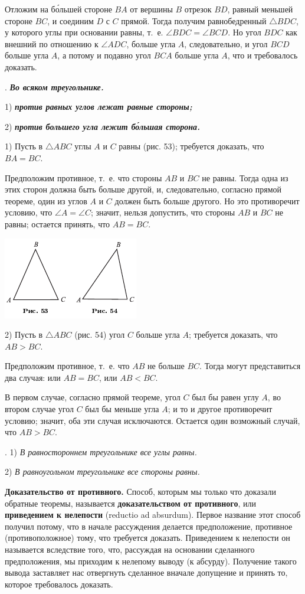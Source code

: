 \documentclass[oneside]{book}
\begin{document}
Отложим на б\'{о}льшей стороне $BA$ от вершины $B$ отрезок $BD$, равный меньшей стороне $BC$, и соединим $D$ с $C$ прямой.
Тогда получим равнобедренный $\triangle BDC$, у которого углы при основании равны, т.~е. $\angle BDC=\angle BCD$.
Но угол $BDC$ как внешний по отношению к $\angle ADC$, больше угла $A$, следовательно, и угол $BCD$ больше угла $A$, а потому и подавно угол $BCA$ больше угла $A$, что и требовалось доказать.

.
\textbf{\emph{Во всяком треугольнике.}}

1) \textbf{\emph{против равных углов лежат равные стороны;}}

2) \textbf{\emph{против большего угла лежит б\'{о}льшая сторона.}}

1) Пусть в $\triangle ABC$ углы $A$ и $C$ равны (рис. 53);
требуется доказать, что $BA = BC$.

Предположим противное, т.~е. что стороны $AB$ и $BC$ не равны.
Тогда одна из этих сторон должна быть больше другой, и, следовательно, согласно прямой теореме, один из углов $A$ и $C$ должен быть больше другого.
Но это противоречит условию, что $\angle A = \angle C$;
значит, нельзя допустить, что стороны $AB$ и $BC$ не равны;
остается принять, что $AB=BC$.

\includegraphics{pics/ris-53-54}

2) Пусть в $\triangle ABC$ (рис. 54)
угол $C$ больше угла $A$;
требуется доказать, что $AB > BC$.

Предположим противное, т.~е. что $AB$ не больше $BC$.
Тогда могут представиться два случая:
или $AB=BC$, или $AB<BC$.

В первом случае, согласно прямой теореме, угол $C$ был бы равен углу $A$, во втором случае угол $C$ был бы меньше угла $A$;
и то и другое противоречит условию;
значит, оба эти случая исключаются.
Остается один возможный случай, что $AB>BC$.

.
1) \emph{В равностороннем треугольнике все углы равны.}

2) \emph{В равноугольном треугольнике все стороны равны.}

\textbf{Доказательство от противного.}
Способ, которым мы только что доказали обратные теоремы, называется \textbf{доказательством от противного}, или \textbf{приведением к нелепости} (reductio ad absurdum).
Первое название этот способ получил потому, что в начале рассуждения делается предположение, противное (противоположное) тому, что требуется доказать.
Приведением к нелепости он называется вследствие того, что, рассуждая на основании сделанного предположения, мы приходим к нелепому выводу (к абсурду).
Получение такого вывода заставляет нас отвергнуть сделанное вначале допущение и принять то, которое требовалось доказать.
\end{document}
